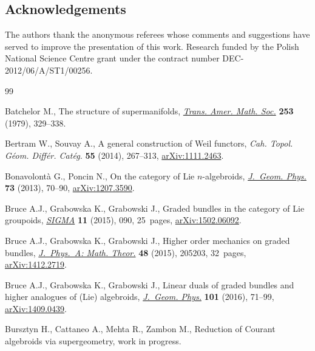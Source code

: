 \documentclass[10pt,a4paper]{amsart}
\numberwithin{equation}{section}
\begin{document}
\subsection*{Acknowledgements}
The authors thank the anonymous referees whose comments and suggestions have served to improve the presentation of this work. Research funded by the Polish National Science Centre grant under the contract number DEC-2012/06/A/ST1/00256.


\begin{thebibliography}{99}
\footnotesize\itemsep=0pt

Batchelor M., The structure of supermanifolds, \href{http://dx.doi.org/10.2307/1998201}{\textit{Trans. Amer. Math. Soc.}}
  \textbf{253} (1979), 329--338.

Bertram W., Souvay A., A general construction of {W}eil functors, \textit{Cah.
  Topol. G\'eom. Diff\'er. Cat\'eg.} \textbf{55} (2014), 267--313,
  \href{http://arxiv.org/abs/1111.2463}{arXiv:1111.2463}.

Bonavolont{\`a} G., Poncin N., On the category of {L}ie {$n$}-algebroids,
  \href{http://dx.doi.org/10.1016/j.geomphys.2013.05.004}{\textit{J.~Geom. Phys.}} \textbf{73} (2013), 70--90, \href{http://arxiv.org/abs/1207.3590}{arXiv:1207.3590}.

Bruce A.J., Grabowska K., Grabowski J., Graded bundles in the category of {L}ie
  groupoids, \href{http://dx.doi.org/10.3842/SIGMA.2015.090}{\textit{SIGMA}} \textbf{11} (2015), 090, 25~pages,
  \href{http://arxiv.org/abs/1502.06092}{arXiv:1502.06092}.

Bruce A.J., Grabowska K., Grabowski J., Higher order mechanics on graded
  bundles, \href{http://dx.doi.org/10.1088/1751-8113/48/20/205203}{\textit{J.~Phys.~A: Math. Theor.}} \textbf{48} (2015), 205203,
  32~pages, \href{http://arxiv.org/abs/1412.2719}{arXiv:1412.2719}.

Bruce A.J., Grabowska K., Grabowski J., Linear duals of graded bundles and
  higher analogues of ({L}ie) algebroids, \href{http://dx.doi.org/10.1016/j.geomphys.2015.12.004}{\textit{J.~Geom. Phys.}} \textbf{101}
  (2016), 71--99, \href{http://arxiv.org/abs/1409.0439}{arXiv:1409.0439}.

Bursztyn H., Cattaneo A., Mehta R., Zambon M., Reduction of Courant algebroids
  via supergeometry, work in progress.


\end{thebibliography}
\end{document}
